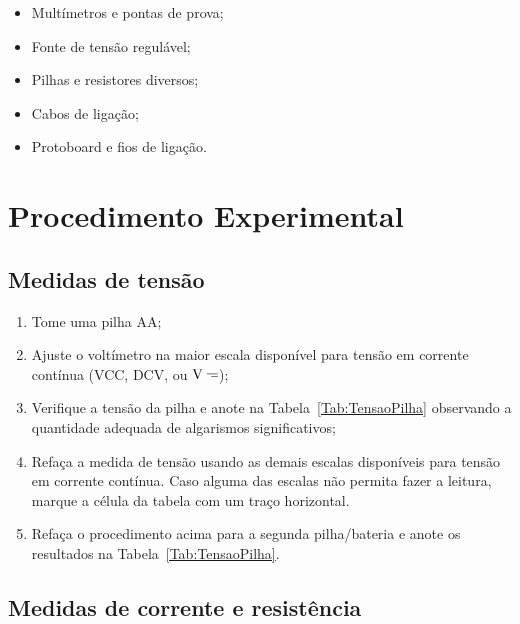 \begin{itemize}
	\item Multímetros e pontas de prova;
	\item Fonte de tensão regulável;
	\item Pilhas e resistores diversos;
	\item Cabos de ligação;
	\item Protoboard e fios de ligação.
\end{itemize}

\section{Procedimento Experimental}

\subsection{Medidas de tensão} %
\begin{enumerate}
	\item Tome uma pilha AA;
	\item Ajuste o voltímetro na maior escala disponível para tensão em corrente contínua (VCC, DCV, ou $\rm{V}\mathdirectcurrent$);
	\item Verifique a tensão da pilha e anote na Tabela~\ref{Tab:TensaoPilha} observando a quantidade adequada de algarismos significativos;
	\item Refaça a medida de tensão usando as demais escalas disponíveis para tensão em corrente contínua. Caso alguma das escalas não permita fazer a leitura, marque a célula da tabela com um traço horizontal.
	\item Refaça o procedimento acima para a segunda pilha/bateria e anote os resultados na Tabela~\ref{Tab:TensaoPilha}.
\end{enumerate}

\subsection{Medidas de corrente e resistência}

